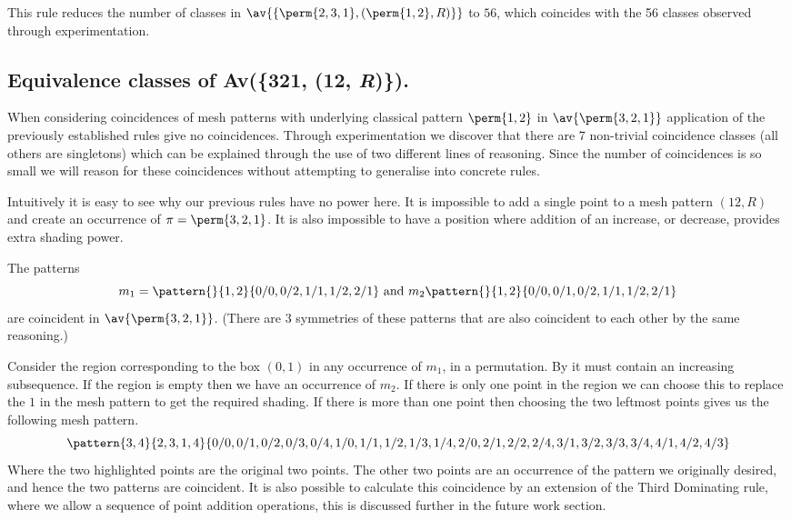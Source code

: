 This rule reduces the number of classes in
\(\av{\{\perm{2,3,1},(\perm{1,2}, R)\}}\) to \(56\), which coincides with the
56 classes observed through experimentation.

\subsection{Equivalence classes of Av(\{321, (12, \textit{R})\}).}
When considering coincidences of mesh patterns with underlying classical
pattern \(\perm{1,2}\) in \(\av{\perm{3,2,1}}\) application of the previously
established rules give no coincidences. Through experimentation we discover
that there are \(7\) non-trivial coincidence classes (all others are singletons)
which can be explained through the
use of two different lines of reasoning. Since the number of coincidences is
so small we will reason for these coincidences without attempting to generalise
into concrete rules.

Intuitively it is easy to see why our previous rules have no
power here. It is impossible to add a single point to a mesh pattern \((12, R)\) and
create an occurrence of \(\pi = \perm{3,2,1}\). It is also impossible to have
a position where addition of an increase, or decrease, provides extra
shading power.

The patterns
\begin{equation*}
    m_1 = \pattern{}{1,2}{0/0, 0/2, 1/1, 1/2, 2/1} \text { and } m_2 \pattern{}{1,2}{0/0, 0/1, 0/2, 1/1, 1/2, 2/1}
\end{equation*}
are coincident in \(\av{\perm{3,2,1}}\). (There are 3 symmetries of these
patterns that are also coincident to each other by the same reasoning.)

Consider the region corresponding to the box \((0,1)\) in any occurrence of \(m_1\),
in a permutation. By  it must contain an increasing subsequence.
If the region is empty then we have an occurrence of \(m_2\).
If there is only one point in the region we can choose this to replace the \(1\) in
the mesh pattern to get the required shading. If there is more than one point then
choosing the two leftmost points gives us the following mesh pattern.
\begin{equation*}
    \pattern{3,4}{2,3,1,4}{0/0, 0/1, 0/2, 0/3, 0/4,
                            1/0, 1/1, 1/2, 1/3, 1/4,
                            2/0, 2/1,2/2, 2/4,
                            3/1, 3/2, 3/3, 3/4,
                            4/1, 4/2, 4/3}
\end{equation*}
Where the two highlighted points are the original two points.
The other two points are an occurrence of the pattern
we originally desired, and hence the two patterns are coincident.
It is also possible to calculate this coincidence by an extension of the Third
Dominating rule, where we allow a sequence of point addition operations, this
is discussed further in the future work section.

